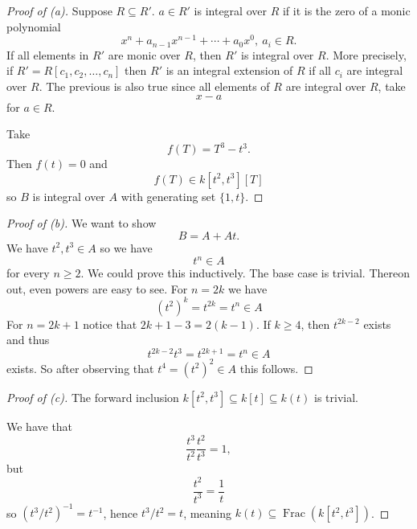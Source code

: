 \documentclass[11pt]{article}
\begin{document}
\begin{proof}[Proof of (a)]
    Suppose $R \subseteq R'$. $a \in R'$ 
    is integral over $R$ if it is the zero of a monic 
    polynomial 
    \[
        x^n + a_{n-1}x^{n-1} + \cdots + 
        a_0 x^0, \ a_i \in R. 
    \]
    If all elements in $R'$ are monic over $R$, then 
    $R'$ is integral over $R$. More precisely, if 
    $R' = R[c_1,c_2,\ldots,c_n]$ then $R'$ is an integral 
    extension of $R$ if all $c_i$ are integral over $R$. 
    The previous is also true since all elements of 
    $R$ are integral over $R$, take 
    \[
        x - a 
    \]
    for $a \in R$. 

    Take 
    \[
        f(T) = T^3 - t^3. 
    \]
    Then $f(t) = 0$ and 
    \[
        f(T) \in k[t^2,t^3][T]
    \]
    so $B$ is integral over $A$ with generating set 
    $\{1,t\}$. 
\end{proof}
\begin{proof}[Proof of (b)]
    We want to show 
    \[
        B = A + At. 
    \]
    We have $t^2,t^3 \in A$ so we have 
    \[
        t^n \in A 
    \]
    for every $n \geq 2$. 
    We could prove this inductively. The base 
    case is trivial. Thereon out, even powers are easy to 
    see. For $n = 2k$ we have 
    \[
        (t^2)^k = t^{2k} = t^n \in A
    \]
    For $n = 2k+1$ notice that $2k + 1 - 3 = 2(k-1)$. 
    If $k \geq 4$, then $t^{2k-2}$ exists and 
    thus 
    \[
        t^{2k-2}t^3 = t^{2k+1} = t^n \in A 
    \]
    exists. So after observing that $t^4 = (t^2)^2 \in A$ 
    this follows.
    
\end{proof}
\begin{proof}[Proof of (c)]
    The forward inclusion 
    $k[t^2,t^3] \subseteq k[t] \subseteq k(t)$ is 
    trivial. 

    We have that 
    \[
        \frac{t^3}{t^2} 
        \frac{t^2}{t^3} = 1, 
    \]
    but 
    \[
        \frac{t^2}{t^3} 
        = \frac{1}{t} 
    \]
    so $(t^3/t^2)^{-1} = t^{-1}$, hence 
    $t^3/t^2 = t$, meaning 
    $k(t) \subseteq \operatorname{Frac}(k[t^2,t^3])$. 
\end{proof}
\end{document}
